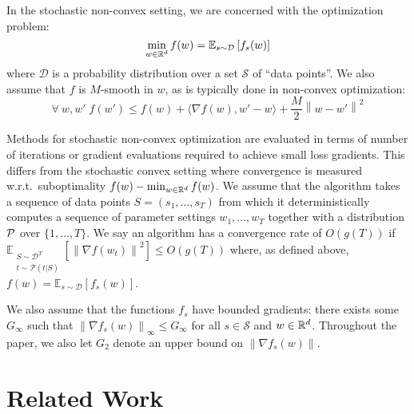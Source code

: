 \documentclass{article}
\newcommand{\norm}[1]{\left\lVert{#1}\right\rVert}
\newcommand{\w}{w}
\newcommand{\fs}{f_s}
\newcommand{\normed}[1]{\left\lVert {#1} \right\rVert}
\newcommand{\smooth}{M}
\newcommand{\gradb}{G_\infty}
\newcommand{\gradbtwo}{G_2}
\newcommand{\supp}{\mathcal S}
\newcommand{\expec}[2]{\mathbb E_{#1} \left[ {#2} \right]}
\newcommand{\algrand}{\substack{S \sim \dist^T \\ t \sim \mathcal P(t|S)}}
\newcommand{\dist}{\mathcal D}
\begin{document}
In the stochastic non-convex setting, we are concerned with the optimization
problem:
\begin{equation}
   \min_{\w \in \R^d} f(w) = \expec{s \sim \dist}{\fs(\w)}
\end{equation}
where $\dist$ is a probability distribution over a set $\supp$ of
``data points''.  We also assume that $f$ is $\smooth$-smooth in $w$, as is
typically done in non-convex optimization:
\begin{equation}
   \forall~w,\w'\;
      f (\w') \leq
      f (\w) +
      \langle \nabla f (\w), \w' - \w \rangle +
      \frac{\smooth}{2} \normed{\w - \w'}^2
\end{equation}

Methods for stochastic non-convex optimization are evaluated in terms of number
of iterations or gradient evaluations required to achieve small loss gradients.
This differs from the stochastic convex setting where convergence is measured
w.r.t.~suboptimality $f(\w) - \min_{\w \in \R^d} f(\w)$.  We assume that the
algorithm takes a sequence of data points $S = (s_1, \ldots, s_T)$ from which
it deterministically computes a sequence of parameter settings
$w_1, \ldots, w_T$ together with a distribution ${\cal P}$ over
$\{1,\ldots,T\}$.  We say an algorithm has a convergence rate of $O(g(T))$ if
$\expec{\algrand}{\normed{\nabla f(w_t)}^2}
   \leq O(g(T))$ where, as defined above, $f(w) = \expec{s\sim \dist}{\fs(w)}$.

We also assume that the functions $\fs$ have bounded gradients: there exists
some $\gradb$ such that
   $\normed{\nabla \fs (\w)}_\infty \leq \gradb$
for all $s \in \supp$ and $\w \in \R^d$.  Throughout the paper, we also let
$\gradbtwo$ denote an upper bound on $\norm{\nabla \fs (\w)}$.
 \section{Related Work}
\label{sec:related}
\end{document}
